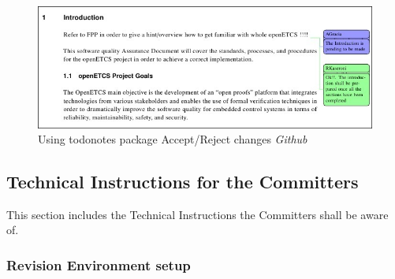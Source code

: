 \documentclass{template/openetcs_article}
\begin{document}
\begin{figure}[H]
\centering
\includegraphics [width=\textwidth]{./figures/CommentConfirmation.JPG}
\caption{Using todonotes package Accept/Reject changes {\it Github}}
\end{figure}

\subsection{Technical Instructions for the Committers}

This section includes the Technical Instructions the Committers shall be aware of.

\subsubsection{Revision Environment setup}
\end{document}
